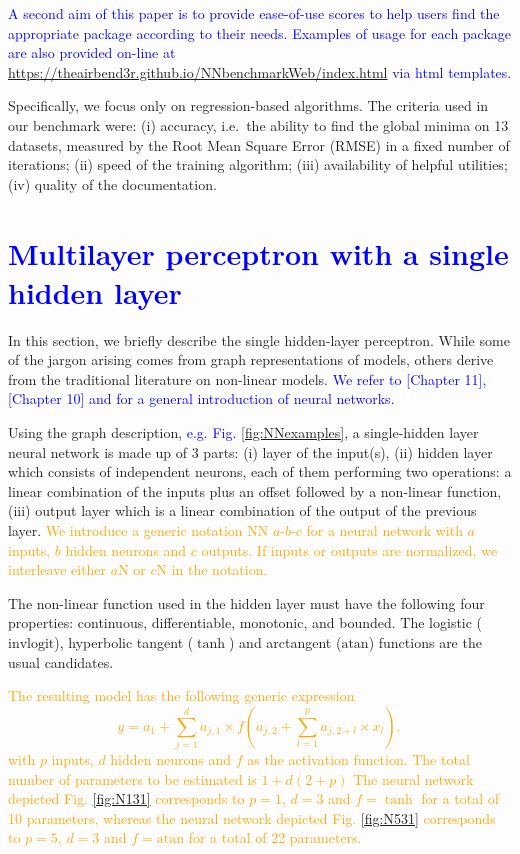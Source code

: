 \textcolor{blue}{A second aim of this paper is to
provide ease-of-use scores to help users find the
appropriate package according to their needs. 
Examples of usage for each package are also provided
on-line at \url{https://theairbend3r.github.io/NNbenchmarkWeb/index.html}
via html templates.}

Specifically, we focus only on regression-based algorithms. The criteria
used in our benchmark were: (i) accuracy, i.e.~the ability to find the
global minima on 13 datasets, measured by the Root Mean Square Error
(RMSE) in a fixed number of iterations; (ii) speed of the training
algorithm; (iii) availability of helpful utilities; (iv) quality of the
documentation.

\hypertarget{section}{%
\section{\texorpdfstring{\textcolor{blue}{Multilayer perceptron with a single hidden layer}}{}}\label{section}}

In this section, we briefly describe the single hidden-layer perceptron.
While some of the jargon arising comes from graph representations of
models, others derive from the traditional literature on non-linear
models. \textcolor{blue}{
We refer to \cite{friedman2001elements}[Chapter 11], 
\cite{izenman2008modern}[Chapter 10] and
\cite{ripley2007pattern} for a general introduction 
of neural networks.}

Using the graph description,
\textcolor{blue}{e.g. Fig. \ref{fig:NNexamples}}, a single-hidden layer
neural network is made up of 3 parts: (i) layer of the input(s), (ii)
hidden layer which consists of independent neurons, each of them
performing two operations: a linear combination of the inputs plus an
offset followed by a non-linear function, (iii) output layer which is a
linear combination of the output of the previous layer.
\textcolor{orange}{We introduce a generic notation NN $a$-$b$-$c$ for a neural network
with $a$ inputs, $b$ hidden neurons and $c$ outputs. If inputs or outputs
are normalized, we interleave either $a$N or $c$N in the notation.}

The non-linear function used in the hidden layer must have the following
four properties: continuous, differentiable, monotonic, and bounded. The
logistic (\(\text{invlogit}\)), hyperbolic tangent (\(\tanh\)) and
arctangent (\(\text{atan}\)) functions are the usual candidates.

\textcolor{orange}{
The resulting model has the following generic expression 
$$
y = a_1 + \sum_{j=1}^d a_{j,1} \times f(a_{j,2}+\sum_{l=1}^p a_{j,2+l}\times x_l),
$$
with $p$ inputs, $d$ hidden neurons and $f$ as the activation function.
The total number of parameters to be estimated is $1+d(2+p)$
The neural network depicted Fig. \ref{fig:N131} corresponds to $p=1$, $d=3$ and $f=\tanh$
for a total of 10 parameters,
whereas the neural network depicted Fig. \ref{fig:N531} corresponds to $p=5$, $d=3$ and $f=\text{atan}$
for a total of 22 parameters.}

